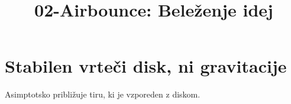 \documentclass[11pt,a4paper]{article}
\title{02-Airbounce: Beleženje idej}
\date{}
\begin{document}
\maketitle

\section{Stabilen vrteči disk, ni gravitacije}
Asimptotsko približuje tiru, ki je vzporeden z diskom.
\end{document}
